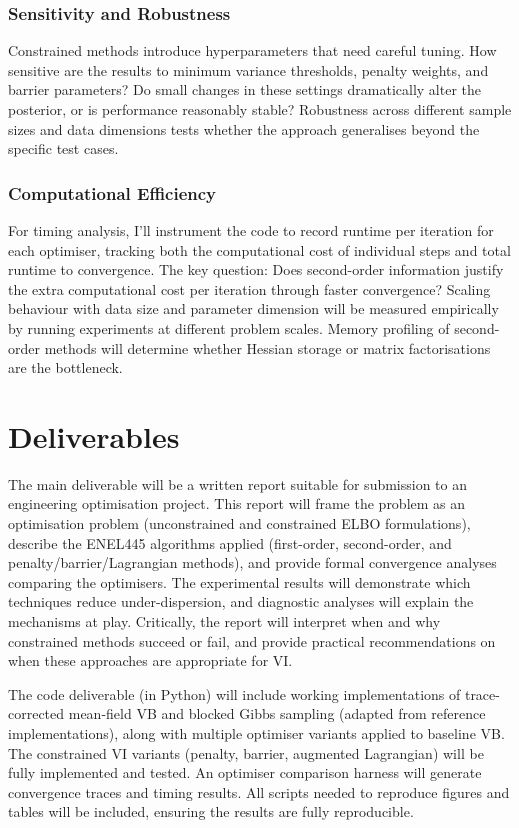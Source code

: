 \documentclass[11pt,a4paper]{article}
\begin{document}
\subsubsection*{Sensitivity and Robustness}

Constrained methods introduce hyperparameters that need careful tuning. How sensitive are the results to minimum variance thresholds, penalty weights, and barrier parameters? Do small changes in these settings dramatically alter the posterior, or is performance reasonably stable? Robustness across different sample sizes and data dimensions tests whether the approach generalises beyond the specific test cases.

\subsubsection*{Computational Efficiency}

For timing analysis, I'll instrument the code to record runtime per iteration for each optimiser, tracking both the computational cost of individual steps and total runtime to convergence. The key question: Does second-order information justify the extra computational cost per iteration through faster convergence? Scaling behaviour with data size and parameter dimension will be measured empirically by running experiments at different problem scales. Memory profiling of second-order methods will determine whether Hessian storage or matrix factorisations are the bottleneck.

\section{Deliverables}

The main deliverable will be a written report suitable for submission to an engineering optimisation project. This report will frame the problem as an optimisation problem (unconstrained and constrained ELBO formulations), describe the ENEL445 algorithms applied (first-order, second-order, and penalty/barrier/Lagrangian methods), and provide formal convergence analyses comparing the optimisers. The experimental results will demonstrate which techniques reduce under-dispersion, and diagnostic analyses will explain the mechanisms at play. Critically, the report will interpret when and why constrained methods succeed or fail, and provide practical recommendations on when these approaches are appropriate for VI.

The code deliverable (in Python) will include working implementations of trace-corrected mean-field VB and blocked Gibbs sampling (adapted from reference implementations), along with multiple optimiser variants applied to baseline VB. The constrained VI variants (penalty, barrier, augmented Lagrangian) will be fully implemented and tested. An optimiser comparison harness will generate convergence traces and timing results. All scripts needed to reproduce figures and tables will be included, ensuring the results are fully reproducible.
\end{document}
